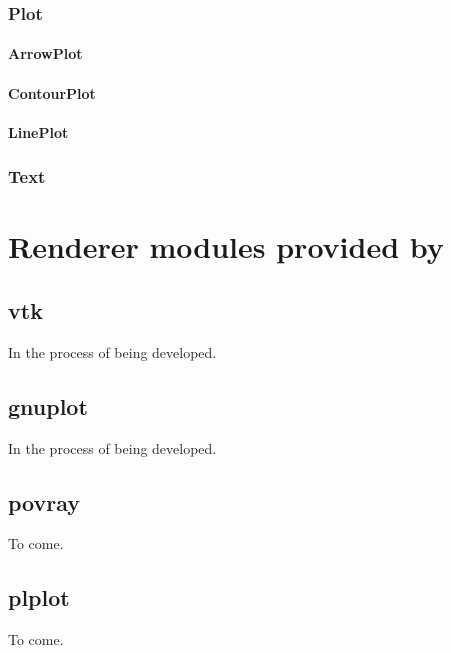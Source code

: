 \subsection{Plot}

\subsubsection{ArrowPlot}

\subsubsection{ContourPlot}

\subsubsection{LinePlot}

\subsection{Text}


\chapter{Renderer modules provided by \pyvisi}

\section{vtk}

In the process of being developed.

\section{gnuplot}

In the process of being developed.

\section{povray}

To come.

\section{plplot}

To come.


